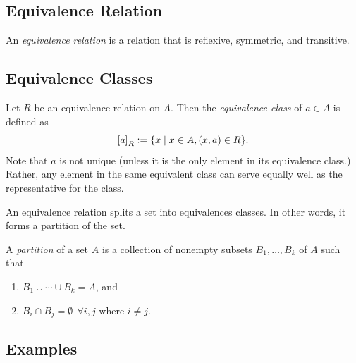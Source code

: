 \documentclass[12pt,letterpaper]{article}
\newcommand{\defeq}{\vcentcolon=}
\begin{document}
    \subsection{Equivalence Relation}
    An \textit{equivalence relation} is a relation that is reflexive, symmetric, and transitive.
    
    \subsection{Equivalence Classes}
    Let $R$ be an equivalence relation on $A$. Then the \textit{equivalence class} of $a \in A$ is defined as
    \[
    \left[a\right]_R \defeq \{x \mid x\in A, (x,a) \in R\}.
    \]
    Note that $a$ is not unique (unless it is the only element in its equivalence class.) Rather, any element in the same equivalent class can serve equally well as the representative for the class.
    
    An equivalence relation splits a set into equivalences classes. In other words, it forms a partition of the set.
    
    A \textit{partition} of a set $A$ is a collection of nonempty subsets $B_1, \ldots, B_k$ of $A$ such that
    \begin{enumerate}
    \item $B_1 \cup \cdots \cup B_k = A$, and
    \item $B_i \cap B_j = \emptyset \ \ \forall i,j \text{ where } i \neq j$.
    \end{enumerate}
    
    \subsection{Examples}
    
\end{document}
